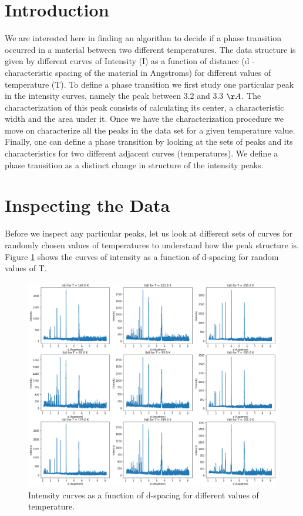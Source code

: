 

\section{Introduction} \label{Intro}
	We are interested here in finding an algorithm to decide if a phase transition occurred in a material between two different temperatures. The data structure is given by different curves of Intensity (I) as a function of distance (d - characteristic spacing of the material in Angstroms) for different values of temperature (T).
To define a phase transition we first study one particular peak in the intensity curves, namely the peak between 3.2 and 3.3 ${\AA}$. The characterization of this peak consists of calculating its center, a characteristic width and the area under it.
Once we have the characterization procedure we move on  characterize all the peaks in the data set for a given temperature value. Finally, one can define a phase transition by looking at the sets of peaks and its characteristics for two different adjacent curves (temperatures). We define a phase transition as a distinct change in structure of the intensity peaks.

\section{Inspecting the Data} \label{Data}
	Before we inspect any particular peaks, let us look at different sets of curves for randomly chosen values of temperatures to understand how the peak structure is. Figure \ref{fig:randTs}  shows the curves of intensity as a function of d-spacing for random values of T.

\begin{figure}[h]
  \centering
  \includegraphics[scale=0.25]{../figs/randomTs.png}
  \caption{Intensity curves as a function of d-spacing for different values of temperature.}
  \label{fig:randTs}
\end{figure}

